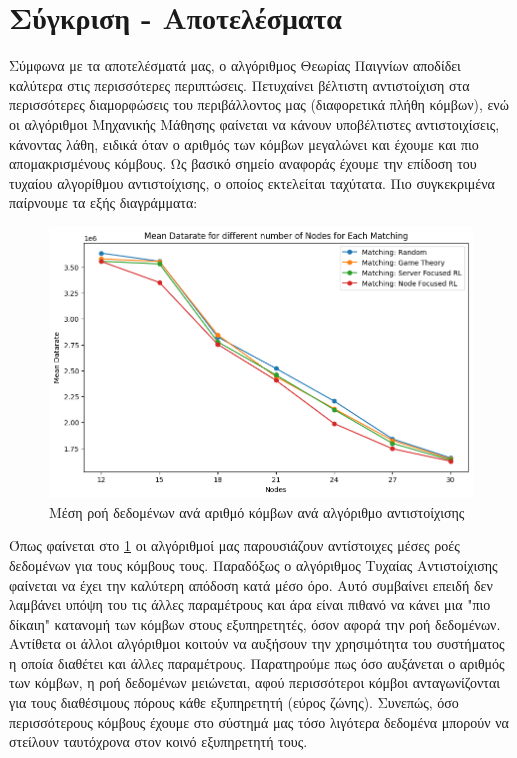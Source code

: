 \section{Σύγκριση - Αποτελέσματα}

Σύμφωνα με τα αποτελέσματά μας, ο αλγόριθμος Θεωρίας Παιγνίων αποδίδει καλύτερα στις περισσότερες περιπτώσεις. Πετυχαίνει βέλτιστη αντιστοίχιση στα περισσότερες διαμορφώσεις του περιβάλλοντος μας (διαφορετικά πλήθη κόμβων), ενώ οι αλγόριθμοι Μηχανικής Μάθησης φαίνεται να κάνουν υποβέλτιστες αντιστοιχίσεις, κάνοντας λάθη, ειδικά όταν ο αριθμός των κόμβων μεγαλώνει και έχουμε και πιο απομακρισμένους κόμβους. Ως βασικό σημείο αναφοράς έχουμε την επίδοση του τυχαίου αλγορίθμου αντιστοίχισης, ο οποίος εκτελείται ταχύτατα.  Πιο συγκεκριμένα παίρνουμε τα εξής διαγράμματα:

\begin{figure}[H]
    \centering
    \includegraphics[width=\textwidth]{figures/chapter3/Mean_Datarate_vs_Nodes.png}
    \caption{Μέση ροή δεδομένων ανά αριθμό κόμβων ανά αλγόριθμο αντιστοίχισης}
    \label{fig7}
\end{figure}

Όπως φαίνεται στο \ref{fig7} οι αλγόριθμοί μας παρουσιάζουν αντίστοιχες μέσες ροές δεδομένων για τους κόμβους τους. Παραδόξως ο αλγόριθμος Τυχαίας Αντιστοίχισης φαίνεται να έχει την καλύτερη απόδοση κατά μέσο όρο. Αυτό συμβαίνει επειδή δεν λαμβάνει υπόψη του τις άλλες παραμέτρους και άρα είναι πιθανό να κάνει μια "πιο δίκαιη" κατανομή των κόμβων στους εξυπηρετητές, όσον αφορά την ροή δεδομένων. Αντίθετα οι άλλοι αλγόριθμοι κοιτούν να αυξήσουν την χρησιμότητα του συστήματος η οποία διαθέτει και άλλες παραμέτρους. Παρατηρούμε πως όσο αυξάνεται ο αριθμός των κόμβων, η ροή δεδομένων μειώνεται, αφού περισσότεροι κόμβοι ανταγωνίζονται για τους διαθέσιμους πόρους κάθε εξυπηρετητή (εύρος ζώνης). Συνεπώς, όσο περισσότερους κόμβους έχουμε στο σύστημά μας τόσο λιγότερα δεδομένα μπορούν να στείλουν ταυτόχρονα στον κοινό εξυπηρετητή τους.

